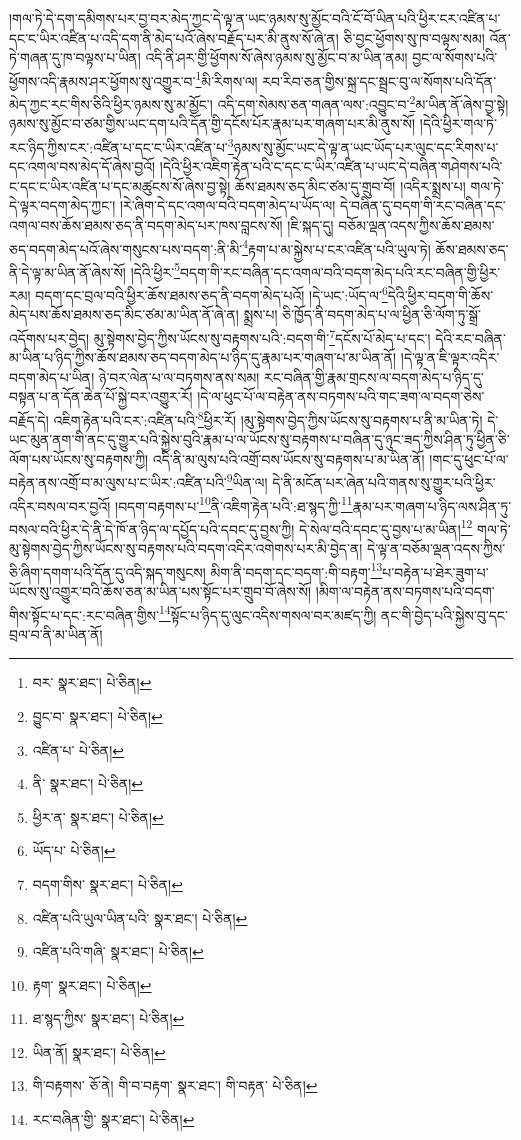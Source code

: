 །གལ་ཏེ་དེ་དག་དམིགས་པར་བྱ་བར་མེད་ཀྱང་དེ་ལྟ་ན་ཡང་ཉམས་སུ་མྱོང་བའི་ངོ་བོ་ཡིན་པའི་ཕྱིར་ངར་འཛིན་པ་དང་ང་ཡིར་འཛིན་པ་འདི་དག་ནི་མེད་པའོ་ཞེས་བརྗོད་པར་མི་ནུས་སོ་ཞེ་ན། ཅི་བྱང་ཕྱོགས་སུ་ཁ་བལྟས་སམ། འོན་ཏེ་གཞན་དུ་ཁ་བལྟས་པ་ཡིན། འདི་ནི་ཤར་གྱི་ཕྱོགས་སོ་ཞེས་ཉམས་སུ་མྱོང་བ་མ་ཡིན་ནམ། བྱང་ལ་སོགས་པའི་ཕྱོགས་འདི་རྣམས་ཤར་ཕྱོགས་སུ་འགྱུར་བ་\footnote{བར་  སྣར་ཐང་།  པེ་ཅིན། }མི་རིགས་ལ། རབ་རིབ་ཅན་གྱིས་སྐྲ་དང་སྦྲང་བུ་ལ་སོགས་པའི་དོན་མེད་ཀྱང་རང་གིས་ཅིའི་ཕྱིར་ཉམས་སུ་མ་མྱོང་། འདི་དག་སེམས་ཅན་གཞན་ལས་:འབྱུང་བ་\footnote{བྱུང་བ་  སྣར་ཐང་།  པེ་ཅིན། }མ་ཡིན་ནོ་ཞེས་བྱ་སྟེ། ཉམས་སུ་མྱོང་བ་ཙམ་གྱིས་ཡང་དག་པའི་དོན་གྱི་དངོས་པོར་རྣམ་པར་གཞག་པར་མི་ནུས་སོ། །དེའི་ཕྱིར་གལ་ཏེ་རང་ཉིད་ཀྱིས་ངར་:འཛིན་པ་དང་ང་ཡིར་འཛིན་པ་\footnote{འཛིན་པ་  པེ་ཅིན། }ཉམས་སུ་མྱོང་ཡང་དེ་ལྟ་ན་ཡང་ཡོད་པར་ལུང་དང་རིགས་པ་དང་འགལ་བས་མེད་དོ་ཞེས་བྱའོ། །དེའི་ཕྱིར་འཇིག་རྟེན་པའི་ང་དང་ང་ཡིར་འཛིན་པ་ཡང་དེ་བཞིན་གཤེགས་པའི་ང་དང་ང་ཡིར་འཛིན་པ་དང་མཚུངས་སོ་ཞེས་བྱ་སྟེ། ཆོས་ཐམས་ཅད་མིང་ཙམ་དུ་གྲུབ་བོ། །འདིར་སྨྲས་པ། གལ་ཏེ་དེ་ལྟར་བདག་མེད་ཀྱང་། །རེ་ཞིག་དེ་དང་འགལ་བའི་བདག་མེད་པ་ཡོད་ལ། དེ་བཞིན་དུ་བདག་གི་རང་བཞིན་དང་འགལ་བས་ཆོས་ཐམས་ཅད་ནི་བདག་མེད་པར་ཁས་བླངས་སོ། །ཇི་སྐད་དུ། བཅོམ་ལྡན་འདས་ཀྱིས་ཆོས་ཐམས་ཅད་བདག་མེད་པའོ་ཞེས་གསུངས་པས་བདག་:ནི་མི་\footnote{ནི་  སྣར་ཐང་།  པེ་ཅིན། }རྟག་པ་མ་སྐྱེས་པ་ངར་འཛིན་པའི་ཡུལ་ཏེ། ཆོས་ཐམས་ཅད་ནི་དེ་ལྟ་མ་ཡིན་ནོ་ཞེས་སོ། །དེའི་ཕྱིར་\footnote{ཕྱིར་ན་  སྣར་ཐང་།  པེ་ཅིན། }བདག་གི་རང་བཞིན་དང་འགལ་བའི་བདག་མེད་པའི་རང་བཞིན་གྱི་ཕྱིར་རམ། བདག་དང་བྲལ་བའི་ཕྱིར་ཆོས་ཐམས་ཅད་ནི་བདག་མེད་པའོ། །དེ་ཡང་:ཡོད་ལ་\footnote{ཡོད་པ་  པེ་ཅིན། }དེའི་ཕྱིར་བདག་གི་ཆོས་མེད་པས་ཆོས་ཐམས་ཅད་མིང་ཙམ་མ་ཡིན་ནོ་ཞེ་ན། སྨྲས་པ། ཅི་ཁྱོད་ནི་བདག་མེད་པ་ལ་ཕྱིན་ཅི་ལོག་ཏུ་སྒྲོ་འདོགས་པར་བྱེད། མུ་སྟེགས་བྱེད་ཀྱིས་ཡོངས་སུ་བརྟགས་པའི་:བདག་གི་\footnote{བདག་གིས་  སྣར་ཐང་།  པེ་ཅིན། }དངོས་པོ་མེད་པ་དང་། དེའི་རང་བཞིན་མ་ཡིན་པ་ཉིད་ཀྱིས་ཆོས་ཐམས་ཅད་བདག་མེད་པ་ཉིད་དུ་རྣམ་པར་གཞག་པ་མ་ཡིན་ནོ། །དེ་ལྟ་ན་ཇི་ལྟར་འདིར་བདག་མེད་པ་ཡིན། ཉེ་བར་ལེན་པ་ལ་བཏགས་ནས་སམ། རང་བཞིན་གྱི་རྣམ་གྲངས་ལ་བདག་མེད་པ་ཉིད་དུ་བསྟན་པ་ན་དོན་ཆེན་པོ་སྐྱེ་བར་འགྱུར་རོ། །དེ་ལ་ཕུང་པོ་ལ་བརྟེན་ནས་བཏགས་པའི་གང་ཟག་ལ་བདག་ཅེས་བརྗོད་དེ། འཇིག་རྟེན་པའི་ངར་:འཛིན་པའི་\footnote{འཛིན་པའི་ཡུལ་ཡིན་པའི་  སྣར་ཐང་།  པེ་ཅིན། }ཕྱིར་རོ། །མུ་སྟེགས་བྱེད་ཀྱིས་ཡོངས་སུ་བརྟགས་པ་ནི་མ་ཡིན་ཏེ། དེ་ཡང་མུན་ནག་གི་ནང་དུ་གྱུར་པའི་སྐྱེས་བུའི་རྣམ་པ་ལ་ཡོངས་སུ་བརྟགས་པ་བཞིན་དུ་ཉུང་ཟད་ཀྱིས་ཤིན་ཏུ་ཕྱིན་ཅི་ལོག་པས་ཡོངས་སུ་བརྟགས་ཀྱི། འདི་ནི་མ་ལུས་པའི་འགྲོ་བས་ཡོངས་སུ་བརྟགས་པ་མ་ཡིན་ནོ། །གང་དུ་ཕུང་པོ་ལ་བརྟེན་ནས་འགྲོ་བ་མ་ལུས་པ་ང་ཡིར་:འཛིན་པའི་\footnote{འཛིན་པའི་གཞི་  སྣར་ཐང་།  པེ་ཅིན། }ཡིན་ལ། དེ་ནི་མངོན་པར་ཞེན་པའི་གནས་སུ་གྱུར་པའི་ཕྱིར་འདིར་བསལ་བར་བྱའོ། །བདག་བརྟགས་པ་\footnote{རྟག་  སྣར་ཐང་།  པེ་ཅིན། }ནི་འཇིག་རྟེན་པའི་:ཐ་སྙད་ཀྱི་\footnote{ཐ་སྙད་ཀྱིས་  སྣར་ཐང་།  པེ་ཅིན། }རྣམ་པར་གཞག་པ་ཉིད་ལས་ཤིན་ཏུ་བསལ་བའི་ཕྱིར་དེ་ནི་དེ་ཁོ་ན་ཉིད་ལ་དཔྱོད་པའི་དབང་དུ་བྱས་ཀྱི། དེ་སེལ་བའི་དབང་དུ་བྱས་པ་མ་ཡིན།\footnote{ཡིན་ནོ།  སྣར་ཐང་།  པེ་ཅིན། } གལ་ཏེ་མུ་སྟེགས་བྱེད་ཀྱིས་ཡོངས་སུ་བརྟགས་པའི་བདག་འདིར་འགེགས་པར་མི་བྱེད་ན། དེ་ལྟ་ན་བཅོམ་ལྡན་འདས་ཀྱིས་ཅི་ཞིག་དགག་པའི་དོན་དུ་འདི་སྐད་གསུངས། མིག་ནི་བདག་དང་བདག་:གི་བརྟག་\footnote{གི་བརྟགས་  ཅོ་ནེ། གི་བ་བརྟག་  སྣར་ཐང་། གི་བརྟན་  པེ་ཅིན། }པ་བརྟེན་པ་ཐེར་ཟུག་པ་ཡོངས་སུ་འགྱུར་བའི་ཆོས་ཅན་མ་ཡིན་པས་སྟོང་པར་གྲུབ་བོ་ཞེས་སོ། །མིག་ལ་བརྟེན་ནས་བཏགས་པའི་བདག་གིས་སྟོང་པ་དང་:རང་བཞིན་གྱིས་\footnote{རང་བཞིན་གྱི་  སྣར་ཐང་།  པེ་ཅིན། }སྟོང་པ་ཉིད་དུ་ལུང་འདིས་གསལ་བར་མཛད་ཀྱི། ནང་གི་བྱེད་པའི་སྐྱེས་བུ་དང་བྲལ་བ་ནི་མ་ཡིན་ནོ། 